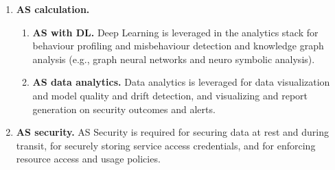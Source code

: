 \begin{enumerate}
\begin{enumerate}
  \end{enumerate}


\item{\bf AS calculation.}

  \begin{enumerate}
  
  \item{\bf AS with DL.} Deep Learning is leveraged in the analytics stack for behaviour profiling and misbehaviour detection and knowledge graph analysis (e.g., graph neural networks and neuro symbolic analysis).
  
  \item{\bf AS data analytics.} Data analytics is leveraged for data visualization and model quality and drift detection, and visualizing and report generation on security outcomes and alerts. 
  
  \end{enumerate}

\item{\bf AS security.} AS Security is required for securing data at rest and during transit, for securely storing service access credentials, and for enforcing resource access and usage policies. 

\end{enumerate}


